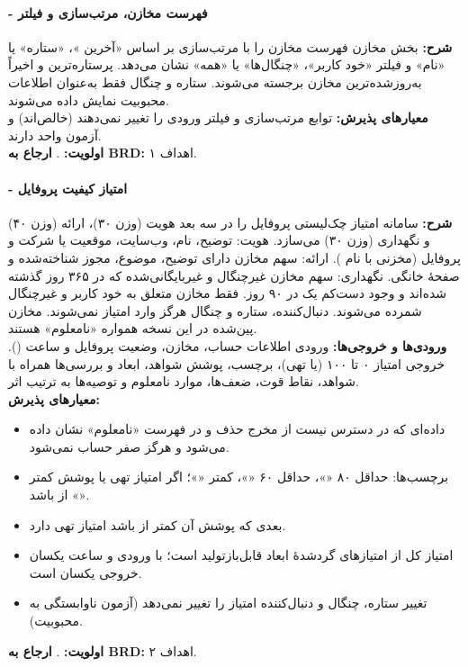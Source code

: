 \documentclass[12pt]{article}
\begin{document}
 \paragraph{ - فهرست مخازن، مرتب‌سازی و فیلتر}
\textbf{شرح:} بخش مخازن فهرست مخازن را با مرتب‌سازی بر اساس «آخرین »، «ستاره» یا «نام» و فیلتر «خود کاربر»، «چنگال‌ها» یا «همه» نشان می‌دهد. پرستاره‌ترین و اخیراً به‌روزشده‌ترین مخازن برجسته می‌شوند. ستاره و چنگال فقط به‌عنوان اطلاعات محبوبیت نمایش داده می‌شوند.
\\
\textbf{معیارهای پذیرش:} توابع مرتب‌سازی و فیلتر ورودی را تغییر نمی‌دهند (خالص‌اند) و آزمون واحد دارند.
\\
\textbf{اولویت:} . \textbf{ارجاع به BRD:} اهداف ۱.
 \paragraph{ - امتیاز کیفیت پروفایل}
\textbf{شرح:} سامانه امتیاز چک‌لیستی پروفایل را در سه بعد هویت (وزن ۳۰)، ارائه (وزن ۴۰) و نگهداری (وزن ۳۰) می‌سازد. هویت: توضیح، نام، وب‌سایت، موقعیت یا شرکت و  پروفایل (مخزنی با نام ). ارائه: سهم مخازن دارای توضیح، موضوع، مجوز شناخته‌شده و صفحهٔ خانگی. نگهداری: سهم مخازن غیرچنگال و غیربایگانی‌شده که در ۳۶۵ روز گذشته  شده‌اند و وجود دست‌کم یک  در ۹۰ روز. فقط مخازن متعلق به خود کاربر و غیرچنگال شمرده می‌شوند. دنبال‌کننده، ستاره و چنگال هرگز وارد امتیاز نمی‌شوند. مخازن پین‌شده در این نسخه همواره «نامعلوم» هستند.
\\
\textbf{ورودی‌ها و خروجی‌ها:} ورودی اطلاعات حساب، مخازن، وضعیت  پروفایل و ساعت (). خروجی امتیاز ۰ تا ۱۰۰ (یا تهی)، برچسب، پوشش شواهد، ابعاد و بررسی‌ها همراه با شواهد، نقاط قوت، ضعف‌ها، موارد نامعلوم و توصیه‌ها به ترتیب اثر.
\\
\textbf{معیارهای پذیرش:}
\begin{itemize}
\item داده‌ای که در دسترس نیست از مخرج حذف و در فهرست «نامعلوم» نشان داده می‌شود و هرگز صفر حساب نمی‌شود.
\item برچسب‌ها: حداقل ۸۰ «»، حداقل ۶۰ «»، کمتر «»؛ اگر امتیاز تهی یا پوشش کمتر از  باشد «».
\item بعدی که پوشش آن کمتر از  باشد امتیاز تهی دارد.
\item امتیاز کل از امتیازهای گردشدهٔ ابعاد قابل‌بازتولید است؛ با ورودی و ساعت یکسان خروجی یکسان است.
\item تغییر ستاره، چنگال و دنبال‌کننده امتیاز را تغییر نمی‌دهد (آزمون ناوابستگی به محبوبیت).
\end{itemize}
\textbf{اولویت:} . \textbf{ارجاع به BRD:} اهداف ۲.
\end{document}
